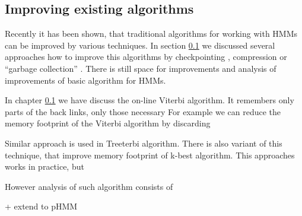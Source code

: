 



%

\subsection{Improving existing algorithms}

Recently it has been shown, that traditional algorithms for working with HMMs
can be improved by various techniques. In section \ref{} we discussed several
approaches how to improve this algorithms by checkpointing \cite{}, compression
\cite{} or ``garbage collection'' \cite{}. There is still space for improvements
and analysis of improvements of basic algorithm for HMMs.


In chapter \ref{} we have discuss the  on-line Viterbi algorithm. It remembers
only parts of the back links, only those necessary  
For example we can reduce the memory
footprint of the Viterbi algorithm by discarding 

Similar approach is used in Treeterbi algorithm. There is also variant of this
technique, that improve memory footprint of k-best algorithm. This approaches
works in practice, but 

However analysis of such algorithm consists of 

+ extend to pHMM







\label{LastPage}
